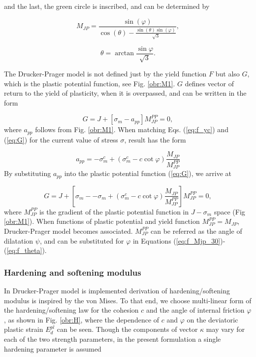 and the last, the green circle is inscribed, and can be determined by

\begin{equation}\label{eq:f_Mjp_i}
	M_{JP} = \dfrac{\sin(\varphi)}{\cos(\theta)-\frac{\sin(\theta)\sin(\varphi)}{\sqrt{3}}},
\end{equation}

\begin{equation}\label{eq:f_theta}
	\theta = \arctan{\frac{\sin{\varphi}}{\sqrt{3}}}.
\end{equation}

The Drucker-Prager model is not defined just by the yield function $F$ but also $G$, which is the plastic potential function, see Fig. \ref{obr:M1}. $G$ defines vector of return to the yield of plasticity, when it is overpassed, and can be written in the form 

\begin{equation}\label{eq:G}
	G = J + \left[ \sigma_m - a_{pp} \right] M_{JP}^{PP} = 0,
\end{equation}
where $a_{pp}$ follows from Fig. \ref{obr:M1}. When matching Eqs. (\ref{eq:f_yc}) and (\ref{eq:G}) for the current value of stress $\sigma$, result has the form

\begin{equation}\label{eq:app}
	a_{pp} = - \sigma_m^c + ( \sigma_m^c - c\cot\varphi) \dfrac{M_{JP}}{M_{JP}^{PP}}
\end{equation} 
By substituting $a_{pp}$ into the plastic potential function (\ref{eq:G}), we arrive at

\begin{equation}\label{eq:plastic_potential}
	G = J + \left[ \sigma_m - - \sigma_m + ( \sigma_m^c - c\cot\varphi) \dfrac{M_{JP}}{M_{JP}^{PP}} \right] M_{JP}^{PP} = 0,
\end{equation}
where $M_{JP}^{PP}$ is the gradient of the plastic potential function in $J-\sigma_m$ space (Fig \ref{obr:M1}). When functions of plastic potential and yield function  $M_{JP}^{PP}=M_{JP}$, Drucker-Prager model becomes associated. $M_{JP}^{PP}$  can be referred as the angle of dilatation $\psi$, and can be substituted for $\varphi$ in Equations (\ref{eq:f_Mjp_30})-(\ref{eq:f_theta}).
 
\subsubsection{Hardening and softening modulus}
\indent

 In Drucker-Prager model is implemented derivation of hardening/softening modulus is inspired by the von Mises. To that end, we choose multi-linear form of the hardening/softening law for the cohesion $c$ and the angle of internal friction $\varphi$, as shown in Fig. \ref{obr:H}, where the dependence of $c$ and $\varphi$ on the deviatoric plastic strain $E_d^{pl}$ can be seen. Though the components of vector $\kappa$ may vary for each of the two strength parameters, in the present formulation a single hardening parameter is assumed 
 
